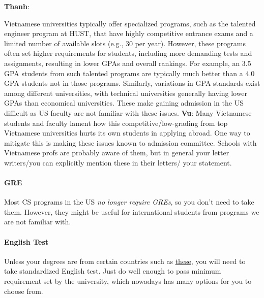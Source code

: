\documentclass[11pt]{article}
\newenvironment{commentbox}[1][]{
\small
    \begin{cbox}
    \textbf{#1}: 
 }{
   \end{cbox}
}
\begin{document}
\begin{commentbox}[Thanh]
Vietnamese universities typically offer specialized programs, such as the talented engineer program at HUST, that have highly competitive entrance exams and a limited number of available slots (e.g., 30 per year). However, these programs often set higher requirements for students, including more demanding tests and assignments, resulting in lower GPAs and overall rankings. For example, an 3.5 GPA students from such talented programs are typically much better than a 4.0 GPA students not in those programs.  Similarly, variations in GPA standards exist among different universities, with technical universities generally having lower GPAs than economical universities. These make gaining admission in the US difficult as US faculty are not familiar with these issues.
\tcblower
\textbf{Vu}: Many Vietnamese students and faculty lament how this competitive/low-grading from top Vietnamese universities hurts its own students in applying abroad. One way to mitigate this is making these issues known to admission committee.  Schools with Vietnamese profs are probably aware of them, but in general your letter writers/you can explicitly mention these in their letters/ your statement.
\end{commentbox}

\paragraph{GRE} Most CS programs in the US \emph{no longer require GREs}, so you don't need to
take them. However, they might be useful for international students from programs we are not familiar with. 

\paragraph{English Test} Unless your degrees are from certain countries such as \href{https://github.com/dynaroars/dynaroars.github.io/wiki/About-GMU#standard-tests-waiver-eligible-countries}{these}, you will need to
take standardized English test. Just do well enough to pass minimum requirement set by the university, which nowadays has many options for you to choose from.
\end{document}

